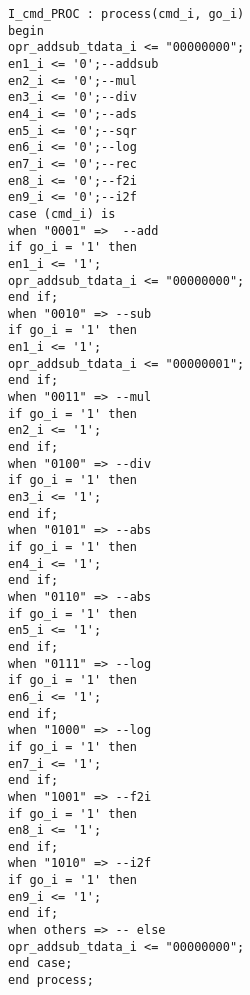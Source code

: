 \documentclass[conference]{IEEEtran}
\begin{document}
\begin{lstlisting}
I_cmd_PROC : process(cmd_i, go_i)
begin
opr_addsub_tdata_i <= "00000000";
en1_i <= '0';--addsub
en2_i <= '0';--mul
en3_i <= '0';--div
en4_i <= '0';--ads
en5_i <= '0';--sqr
en6_i <= '0';--log
en7_i <= '0';--rec
en8_i <= '0';--f2i
en9_i <= '0';--i2f
case (cmd_i) is
when "0001" =>  --add
if go_i = '1' then
en1_i <= '1';
opr_addsub_tdata_i <= "00000000";
end if;
when "0010" => --sub
if go_i = '1' then
en1_i <= '1';
opr_addsub_tdata_i <= "00000001";
end if;
when "0011" => --mul
if go_i = '1' then
en2_i <= '1';
end if;
when "0100" => --div
if go_i = '1' then
en3_i <= '1';
end if;
when "0101" => --abs
if go_i = '1' then
en4_i <= '1';
end if;
when "0110" => --abs
if go_i = '1' then
en5_i <= '1';
end if;
when "0111" => --log
if go_i = '1' then
en6_i <= '1';
end if;
when "1000" => --log
if go_i = '1' then
en7_i <= '1';
end if;
when "1001" => --f2i
if go_i = '1' then
en8_i <= '1';
end if;
when "1010" => --i2f
if go_i = '1' then
en9_i <= '1';
end if;
when others => -- else
opr_addsub_tdata_i <= "00000000";				
end case;
end process;


\end{lstlisting}
\end{document}
